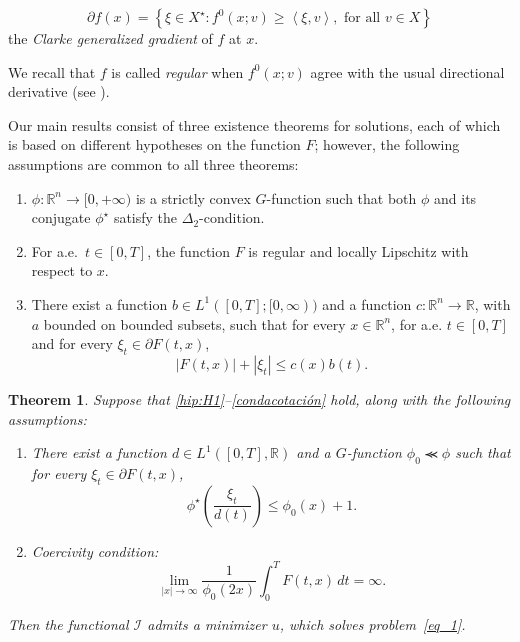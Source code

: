 \documentclass[twoside]{article}
\makeatletter
\theoremstyle{definition}
\theoremstyle{plain}
\newtheorem{teo}[definition]{Theorem}
\theoremstyle{remark}
\newcommand{\labitem}[2]{%
\def\@itemlabel{\textnormal{\textbf{(#1)}}}
\item
\def\@currentlabel{\textnormal{\textbf{(#1)}}}\label{#2}}
\makeatother
\begin{document}
$$
\partial f(x)=\left\{\xi \in X^\star: f^0(x ; v) \geqslant\left\langle \xi, v\right\rangle, \text { for all } v \in X\right\}
$$
the \emph{Clarke generalized gradient} of $f$ at $x$.

We recall that $f$ is called \emph{regular} when $f^0(x;v)$ agree with the usual directional derivative (see \cite{clarke1990optimization,clarke2013functional}).

 
Our main results consist of three existence theorems for solutions, each of which is based on different hypotheses on the function $F$; however, the following assumptions are common to all three theorems:

\begin{enumerate}
    \labitem{H1}{hip:H1} $\phi:\mathbb{R}^n \to [0,+\infty)$ is a strictly convex $G$-function such that both $\phi$ and its conjugate $\phi^\star$ satisfy the $\Delta_2$-condition.
    \labitem{H2}{hip:H2} For a.e.\ $t \in [0,T]$, the function $F$ is regular and locally Lipschitz with respect to $x$.
    \labitem{H3}{condacotación} There exist a function $b \in L^1([0,T];[0,\infty))$ and a function $c:\mathbb{R}^n \rightarrow \mathbb{R}$, with $a$ bounded on bounded subsets, such that for every $x \in \mathbb{R}^n$, for a.e. $t \in [0,T]$ and for every  $\xi_t \in \partial F(t,x)$,
        \begin{equation}\label{eq:condacotación}
            |F(t,x)| + |\xi_t| \leq c(x)b(t).
        \end{equation}
\end{enumerate}


 \begin{teo}\label{coercotasubgrad} Suppose that \ref{hip:H1}--\ref{condacotación}  hold, along with the following assumptions:
\begin{enumerate}

    
    \labitem{H4}{condB} There exist a function $d \in L^1([0,T],\mathbb{R})$ and a $G$-function $\phi_0 \llcurly \phi$ such that for every $\xi_t \in \partial F(t,x)$,
    \begin{equation}\label{eq:condition_grad}
        \phi^\star\left(\frac{\xi_t}{d(t)}\right) \leq \phi_0(x) + 1.
    \end{equation}
    
    \labitem{H5}{condcoermedia1} \textit{Coercivity condition:}
    \begin{equation}\label{eq:I->infinito}
        \lim_{|x| \to \infty} \frac{1}{\phi_0(2x)} \int_0^T F(t,x)\,dt = \infty.
    \end{equation}
\end{enumerate}
Then the functional $\mathcal{I}$ admits a minimizer $u$, which solves problem~\eqref{eq_1}.
\end{teo}
\end{document}
